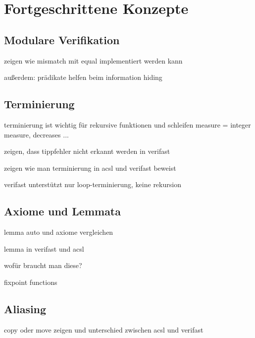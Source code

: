 ﻿
\chapter{Fortgeschrittene Konzepte}

\section{Modulare Verifikation}

zeigen wie mismatch mit equal implementiert werden kann

außerdem: prädikate helfen beim information hiding

\section{Terminierung}

terminierung ist wichtig für rekursive funktionen und schleifen
measure = integer measure, decreases ...

zeigen, dass tippfehler nicht erkannt werden in verifast

zeigen wie man terminierung in acsl und verifast beweist

verifast unterstützt nur loop-terminierung, keine rekursion


\section{Axiome und Lemmata}

lemma auto und axiome vergleichen

lemma in verifast und acsl

wofür braucht man diese?

fixpoint functions

\section{Aliasing}

copy oder move zeigen und unterschied zwischen acsl und verifast




